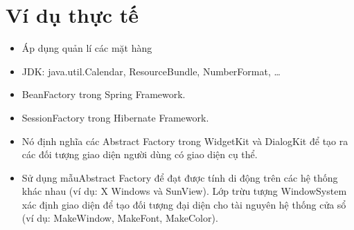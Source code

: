 \section{Ví dụ thực tế}
\begin{itemize}
    \item Áp dụng quản lí các mặt hàng
    \item JDK: java.util.Calendar, ResourceBundle, NumberFormat, …
    \item BeanFactory trong Spring Framework.
    \item SessionFactory trong Hibernate Framework.
    \item Nó định nghĩa các Abstract Factory trong WidgetKit và DialogKit để tạo ra các đối tượng giao diện người dùng có giao diện cụ thể.
    \item Sử dụng mẫuAbstract Factory để đạt được tính di động trên các hệ thống khác nhau (ví dụ: X Windows và SunView). Lớp trừu tượng WindowSystem xác định giao diện để tạo đối tượng đại diện cho tài nguyên hệ thống cửa sổ (ví dụ: MakeWindow, MakeFont, MakeColor).
\end{itemize}

